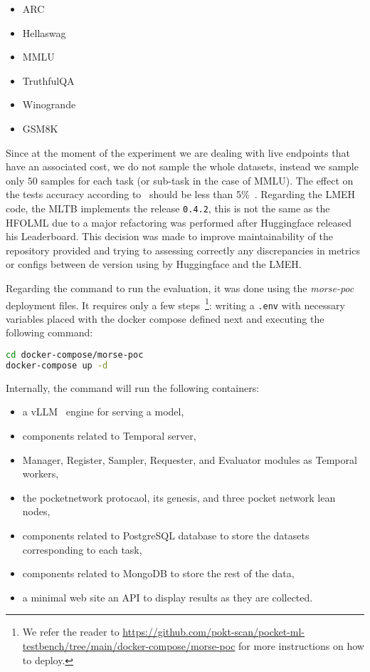 \begin{itemize}[noitemsep]
    \item ARC \cite{Clark2018ThinkYH}
    \item Hellaswag \cite{zellers2019hellaswag}
    \item MMLU \cite{hendrycks_measuring_2021}
    \item TruthfulQA \cite{lin-etal-2022-truthfulqa}
    \item Winogrande \cite{sakaguchi2019winogrande}
    \item GSM8K \cite{cobbe2021training}
\end{itemize}

Since at the moment of the experiment we are dealing with live endpoints that have an associated cost, we do not sample the whole datasets, instead we sample only $50$ samples for each task (or sub-task in the case of MMLU). 
The effect on the tests accuracy according to~\citeauthor{polo_tinybenchmarks_2024} should be less than 5\%~\cite{polo_tinybenchmarks_2024}. 
Regarding the \gls{LMEH}~\cite{biderman_lessons_2024} code, the \gls{MLTB} implements the release \verb|0.4.2|, this is not the same as the \gls{HFOLML} due to a major refactoring was performed after Huggingface released his Leaderboard. 
This decision was made to improve maintainability of the repository provided and trying to assessing correctly any discrepancies in metrics or configs between de version using by Huggingface and the \gls{LMEH}. 

Regarding the command to run the evaluation, it was done using the \emph{morse-poc} deployment files. It requires only a few steps~\footnote{We refer the reader to \url{https://github.com/pokt-scan/pocket-ml-testbench/tree/main/docker-compose/morse-poc} for more instructions on how to deploy.}: writing a \verb|.env| with necessary variables placed with the docker compose defined next and executing the following command:
\begin{lstlisting}[language=bash, caption={Command to run the evaluation.}, numbers=none]
cd docker-compose/morse-poc
docker-compose up -d
\end{lstlisting}

Internally, the command will run the following containers:

\begin{itemize}[noitemsep]
    \item a vLLM~\cite{kwon_efficient_2023} engine for serving a model,
    \item components related to Temporal server,
    \item Manager, Register, Sampler, Requester, and Evaluator modules as Temporal workers,
    \item the pocketnetwork protocaol, its genesis, and three pocket network lean nodes,
    \item components related to PostgreSQL database to store the datasets corresponding to each task,
    \item components related to MongoDB to store the rest of the data, 
    \item a minimal web site an API to display results as they are collected.
\end{itemize}


